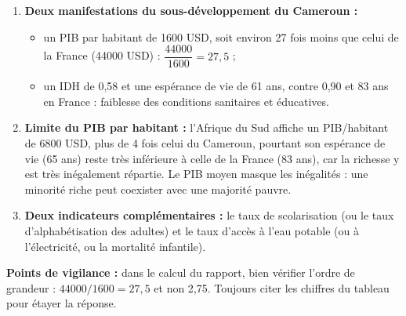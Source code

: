 \documentclass[11pt]{article}
\begin{document}
\begin{corrige}
\begin{enumerate}
\item \textbf{Deux manifestations du sous-développement du Cameroun :}
\begin{itemize}
\item un PIB par habitant de \num{1600} USD, soit environ 27 fois moins que celui de la France (\num{44000} USD) : $\dfrac{\num{44000}}{\num{1600}} = 27,5$ ;
\item un IDH de 0,58 et une espérance de vie de 61 ans, contre 0,90 et 83 ans en France : faiblesse des conditions sanitaires et éducatives.
\end{itemize}
\item \textbf{Limite du PIB par habitant :} l'Afrique du Sud affiche un PIB/habitant de \num{6800} USD, plus de 4 fois celui du Cameroun, pourtant son espérance de vie (65 ans) reste très inférieure à celle de la France (83 ans), car la richesse y est très inégalement répartie. Le PIB moyen masque les inégalités : une minorité riche peut coexister avec une majorité pauvre.
\item \textbf{Deux indicateurs complémentaires :} le taux de scolarisation (ou le taux d'alphabétisation des adultes) et le taux d'accès à l'eau potable (ou à l'électricité, ou la mortalité infantile).
\end{enumerate}
\textbf{Points de vigilance :} dans le calcul du rapport, bien vérifier l'ordre de grandeur : $\num{44000}/\num{1600} = 27,5$ et non 2,75. Toujours citer les chiffres du tableau pour étayer la réponse.
\end{corrige}
\end{document}
